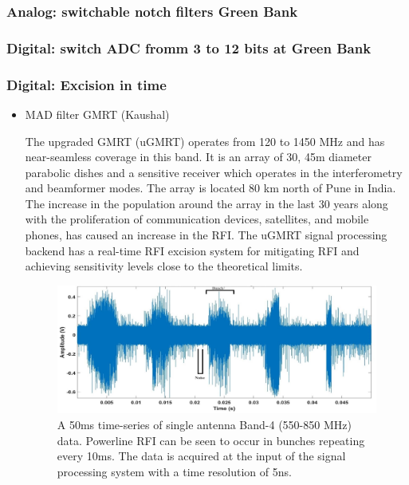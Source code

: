 \subsubsection{Analog: switchable notch filters Green Bank}
\subsubsection{Digital: switch ADC fromm 3 to 12 bits at Green Bank}

\subsubsection{Digital: Excision in time}

\begin{itemize}
\item MAD filter GMRT (Kaushal)

The upgraded GMRT (uGMRT) \cite{gupta2017upgraded} operates from 120 to 1450 MHz and has near-seamless coverage in this band. It is an array of 30, 45m diameter parabolic dishes and a sensitive receiver which operates in the interferometry and beamformer modes. The array is located 80 km north of Pune in India. The increase in the population around the array in the last 30 years along with the proliferation of communication devices, satellites, and mobile phones, has caused an increase in the RFI. The uGMRT signal processing backend has a real-time RFI excision system for mitigating RFI and achieving sensitivity levels close to the theoretical limits. \\

\begin{figure}
    \centering
    \includegraphics[scale=0.7]{Hardware Excision Techniques/figures/Band4_timeseries_ed.jpg}
    \caption{A 50ms time-series of single antenna Band-4 (550-850 MHz) data. Powerline RFI can be seen to occur in bunches repeating every 10ms. The data is acquired at the input of the signal processing system with a time resolution of 5ns.}
    \label{fig:ugmrt-b4-ts}
\end{figure}


\end{itemize}
